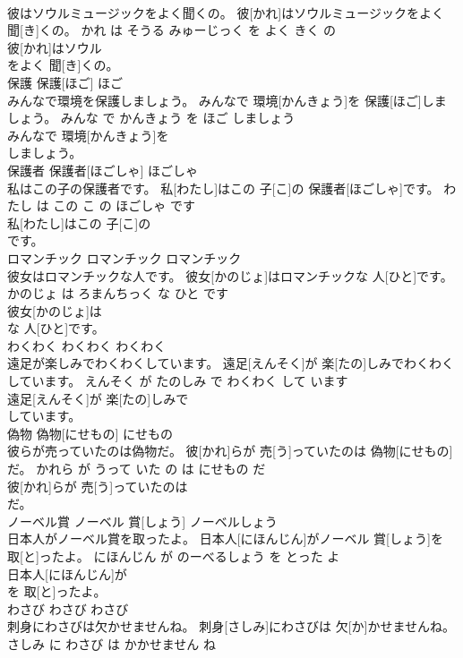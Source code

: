 \documentclass[8pt]{extreport}
\begin{document}
\begin{CJK}{UTF8}{min}
\\	彼はソウルミュージックをよく聞くの。	彼[かれ]はソウルミュージックをよく 聞[き]くの。	かれ は そうる みゅーじっく を よく きく の	
\\	彼[かれ]はソウル
\\	をよく 聞[き]くの。			
\\	保護	保護[ほご]	ほご	
\\	みんなで環境を保護しましょう。	みんなで 環境[かんきょう]を 保護[ほご]しましょう。	みんな で かんきょう を ほご しましょう	
\\	みんなで 環境[かんきょう]を
\\	しましょう。			
\\	保護者	保護者[ほごしゃ]	ほごしゃ	
\\	私はこの子の保護者です。	私[わたし]はこの 子[こ]の 保護者[ほごしゃ]です。	わたし は この こ の ほごしゃ です	
\\	私[わたし]はこの 子[こ]の
\\	です。			
\\	ロマンチック	ロマンチック	ロマンチック	
\\	彼女はロマンチックな人です。	彼女[かのじょ]はロマンチックな 人[ひと]です。	かのじょ は ろまんちっく な ひと です	
\\	彼女[かのじょ]は
\\	な 人[ひと]です。			
\\	わくわく	わくわく	わくわく	
\\	遠足が楽しみでわくわくしています。	遠足[えんそく]が 楽[たの]しみでわくわくしています。	えんそく が たのしみ で わくわく して います	
\\	遠足[えんそく]が 楽[たの]しみで
\\	しています。			
\\	偽物	偽物[にせもの]	にせもの	
\\	彼らが売っていたのは偽物だ。	彼[かれ]らが 売[う]っていたのは 偽物[にせもの]だ。	かれら が うって いた の は にせもの だ	
\\	彼[かれ]らが 売[う]っていたのは
\\	だ。			
\\	ノーベル賞	ノーベル 賞[しょう]	ノーベルしょう	
\\	日本人がノーベル賞を取ったよ。	日本人[にほんじん]がノーベル 賞[しょう]を 取[と]ったよ。	にほんじん が のーべるしょう を とった よ	
\\	日本人[にほんじん]が
\\	を 取[と]ったよ。			
\\	わさび	わさび	わさび	
\\	刺身にわさびは欠かせませんね。	刺身[さしみ]にわさびは 欠[か]かせませんね。	さしみ に わさび は かかせません ね	

\end{CJK}
\end{document}
